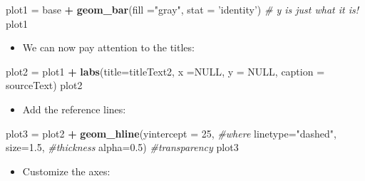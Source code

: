 \documentclass[]{article}
\newenvironment{Shaded}{\begin{snugshade}}{\end{snugshade}}
\newcommand{\KeywordTok}[1]{\textcolor[rgb]{0.13,0.29,0.53}{\textbf{#1}}}
\newcommand{\DataTypeTok}[1]{\textcolor[rgb]{0.13,0.29,0.53}{#1}}
\newcommand{\DecValTok}[1]{\textcolor[rgb]{0.00,0.00,0.81}{#1}}
\newcommand{\FloatTok}[1]{\textcolor[rgb]{0.00,0.00,0.81}{#1}}
\newcommand{\StringTok}[1]{\textcolor[rgb]{0.31,0.60,0.02}{#1}}
\newcommand{\CommentTok}[1]{\textcolor[rgb]{0.56,0.35,0.01}{\textit{#1}}}
\newcommand{\OtherTok}[1]{\textcolor[rgb]{0.56,0.35,0.01}{#1}}
\newcommand{\OperatorTok}[1]{\textcolor[rgb]{0.81,0.36,0.00}{\textbf{#1}}}
\newcommand{\NormalTok}[1]{#1}
\providecommand{\tightlist}{%
  \setlength{\itemsep}{0pt}\setlength{\parskip}{0pt}}
\begin{document}
\begin{Shaded}
\begin{Highlighting}[]
\NormalTok{plot1 =}\StringTok{ }\NormalTok{base }\OperatorTok{+}\StringTok{ }\KeywordTok{geom_bar}\NormalTok{(}\DataTypeTok{fill =}\StringTok{"gray"}\NormalTok{,}
                        \DataTypeTok{stat =} \StringTok{'identity'}\NormalTok{) }\CommentTok{# y is just what it is!}
\NormalTok{plot1}
\end{Highlighting}
\end{Shaded}

\begin{itemize}
\tightlist
\item
  We can now pay attention to the titles:
\end{itemize}

\begin{Shaded}
\begin{Highlighting}[]
\NormalTok{plot2 =}\StringTok{ }\NormalTok{plot1 }\OperatorTok{+}\StringTok{ }\KeywordTok{labs}\NormalTok{(}\DataTypeTok{title=}\NormalTok{titleText2,}
                     \DataTypeTok{x =}\OtherTok{NULL}\NormalTok{, }
                     \DataTypeTok{y =} \OtherTok{NULL}\NormalTok{,}
                     \DataTypeTok{caption =}\NormalTok{ sourceText)}
\NormalTok{plot2}
\end{Highlighting}
\end{Shaded}

\begin{itemize}
\tightlist
\item
  Add the reference lines:
\end{itemize}

\begin{Shaded}
\begin{Highlighting}[]
\NormalTok{plot3 =}\StringTok{ }\NormalTok{plot2 }\OperatorTok{+}\StringTok{ }\KeywordTok{geom_hline}\NormalTok{(}\DataTypeTok{yintercept =} \DecValTok{25}\NormalTok{, }\CommentTok{#where}
                           \DataTypeTok{linetype=}\StringTok{"dashed"}\NormalTok{, }
                           \DataTypeTok{size=}\FloatTok{1.5}\NormalTok{, }\CommentTok{#thickness}
                           \DataTypeTok{alpha=}\FloatTok{0.5}\NormalTok{) }\CommentTok{#transparency}
\NormalTok{plot3}
\end{Highlighting}
\end{Shaded}

\begin{itemize}
\tightlist
\item
  Customize the axes:
\end{itemize}
\end{document}
